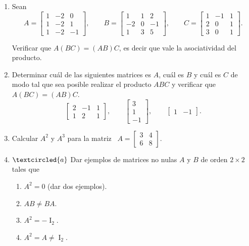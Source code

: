 \begin{enumerate}[topsep=6pt,itemsep=.4cm]


\item\label{ej} Sean
$$
A= \begin{bmatrix} 1&-2&0\\ 1&-2&1\\ 1&-2&-1\end{bmatrix},\quad
\quad B= \begin{bmatrix}1&1&2\\ -2&0&-1\\ 1&3&5 \end{bmatrix},
\quad\quad C=\begin{bmatrix}1&-1&1\\ 2&0&1\\ 3&0&1 \end{bmatrix}.
$$

Verificar que $A(BC)=(AB)C$, es decir que vale la asociatividad del producto.


\item\label{ej2} Determinar cu\'al de las siguientes matrices es $A$, cu\'al es $B$ y cu\'al es $C$ de modo tal que sea posible realizar el producto $ABC$ y verificar que $A(BC)=(AB)C$.
\begin{equation*}
\begin{bmatrix} 2 & -1 & 1 \\ 1 & 2 &
1\end{bmatrix},\qquad
\begin{bmatrix} 3 \\ 1 \\ -1\end{bmatrix}, \qquad
\begin{bmatrix} 1 & -1 \end{bmatrix}.
\end{equation*}


\item Calcular $A^2$ y $A^3$ para la matriz \
$
A=\begin{bmatrix}
3 & 4\\ 6 & 8
\end{bmatrix}.
$


\item\label{ejemplos 2x2} $\textcircled{a}$ Dar ejemplos de matrices no nulas $A$ y $B$ de orden $2\times2$ tales que
\begin{multicols}{2}
\begin{enumerate}[topsep=5pt,itemsep=5pt]
 \item $A^2=0$ (dar dos ejemplos).
 \item $AB\neq BA$.
 \item $A^2=-\operatorname{I}_2$.
 \item $A^2=A\neq\operatorname{I}_2$.
\end{enumerate}
\end{multicols}



\end{enumerate}
